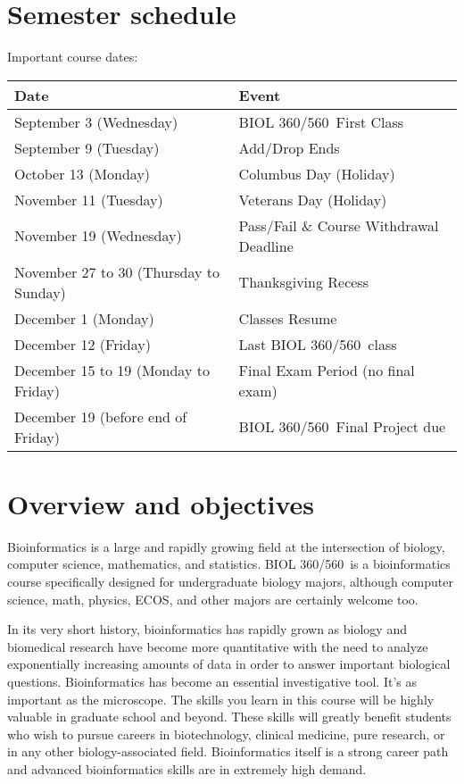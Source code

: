 \documentclass[12pt]{article}
\newcommand{\course}{BIOL 360/560}
\begin{document}
\section{Semester schedule}
\label{sec:schedules}
\begin{minipage}{1.0\linewidth} %

  {Important course dates:  }
  \smallskip

  \begin{tabular}{ll}
    \toprule
    \textbf{Date} & \textbf{Event}\\
    \midrule
    September 3      (Wednesday)             & \course\ First Class                      \\
    September 9      (Tuesday)               & Add/Drop Ends \\
    October 13       (Monday)                & Columbus Day (Holiday) \\
    November 11      (Tuesday)               & Veterans Day (Holiday) \\
    November 19      (Wednesday)             & Pass/Fail \& Course Withdrawal Deadline \\
    November 27 to 30 (Thursday to Sunday)   & Thanksgiving Recess \\
    December 1        (Monday)               & Classes Resume \\
    December 12       (Friday)               & Last \course\ class \\
    December 15 to 19 (Monday to Friday)     & Final Exam Period (no final exam) \\
    December 19       (before end of Friday) &  \course\ Final Project due\\
    \bottomrule
  \end{tabular}
\end{minipage}

\section{Overview and objectives}
\label{sec:objectives}

Bioinformatics is a large and rapidly growing field at the intersection of
biology, computer science, mathematics, and statistics.  \course\ is a
bioinformatics course specifically designed for undergraduate biology majors,
although computer science, math, physics, ECOS, and other majors are certainly
welcome too.


In its very short history, bioinformatics has rapidly grown as
biology and biomedical research have become more quantitative with the need to
analyze exponentially increasing amounts of data in order to answer important
biological questions. Bioinformatics has become an essential investigative
tool. It's as important as the microscope.  The skills you learn in this
course will be highly valuable in graduate school and beyond.  These skills will
greatly benefit students who wish to pursue careers in biotechnology, clinical
medicine, pure research, or in any other biology-associated field.
Bioinformatics itself is a strong career path and advanced bioinformatics skills
are in extremely high demand.
\end{document}
